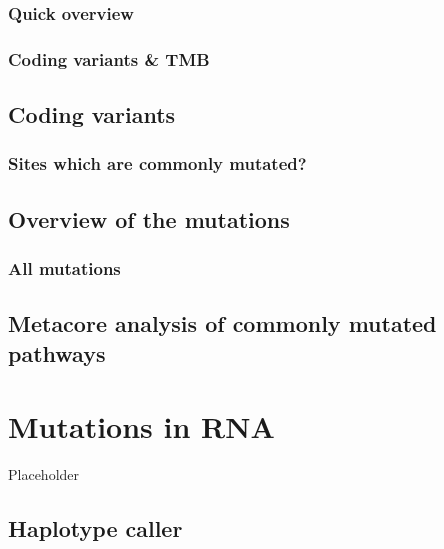 \documentclass[
]{book}
\begin{document}
\hypertarget{quick-overview}{%
\subsection{Quick overview}\label{quick-overview}}

\hypertarget{coding-variants-tmb}{%
\subsection{Coding variants \& TMB}\label{coding-variants-tmb}}

\hypertarget{coding-variants}{%
\section{Coding variants}\label{coding-variants}}

\hypertarget{sites-which-are-commonly-mutated}{%
\subsection{Sites which are commonly mutated?}\label{sites-which-are-commonly-mutated}}

\hypertarget{overview-of-the-mutations}{%
\section{Overview of the mutations}\label{overview-of-the-mutations}}

\hypertarget{all-mutations}{%
\subsection{All mutations}\label{all-mutations}}

\hypertarget{metacore-analysis-of-commonly-mutated-pathways}{%
\section{Metacore analysis of commonly mutated pathways}\label{metacore-analysis-of-commonly-mutated-pathways}}

\hypertarget{mutations-in-rna}{%
\chapter{Mutations in RNA}\label{mutations-in-rna}}

Placeholder

\hypertarget{haplotype-caller}{%
\section{Haplotype caller}\label{haplotype-caller}}
\end{document}

